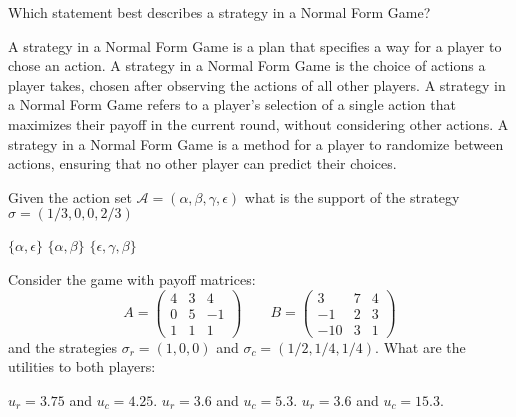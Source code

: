 \documentclass{exam}
\begin{document}
\begin{questions}
        
\question Which statement best describes a strategy in a Normal Form Game?
\begin{checkboxes}
    \choice A strategy in a Normal Form Game is a plan that specifies a way for a player to chose an action.
    \choice A strategy in a Normal Form Game is the choice of actions a player takes, chosen after observing the actions of all other players.
    \choice A strategy in a Normal Form Game refers to a player's selection of a single action that maximizes their payoff in the current round, without considering other actions.
    \choice A strategy in a Normal Form Game is a method for a player to randomize between actions, ensuring that no other player can predict their choices.
\end{checkboxes}

\question Given the action set \(\mathcal{A} = (\alpha, \beta, \gamma,
    \epsilon)\) what is the support of the strategy \(\sigma=(1/3, 0, 0, 2/3)\)

\begin{checkboxes}
    \choice \(\{\alpha, \epsilon\}\)
    \choice \(\{\alpha, \beta\}\)
    \choice \(\{\epsilon, \gamma, \beta\}\)
\end{checkboxes}


\question Consider the game with payoff matrices: 
    \[
        A=\begin{pmatrix}4 & 3 & 4\\
                       0 & 5 & -1\\
                       1 & 1 & 1 
        \end{pmatrix}
        \qquad
        B=\begin{pmatrix}3 & 7 & 4\\
                       -1 & 2 & 3\\
                       -10 & 3 & 1 
        \end{pmatrix}
    \]
    and the strategies \(\sigma_r = (1, 0 ,0)\) and \(\sigma_c=(1/2, 1/4,
    1/4)\). What are the utilities to both players:

\begin{checkboxes}
    \choice \(u_r=3.75\) and \(u_c=4.25\).
    \choice \(u_r=3.6\) and \(u_c=5.3\).
    \choice \(u_r=3.6\) and \(u_c=15.3\).
\end{checkboxes}

\end{questions}
\end{document}
